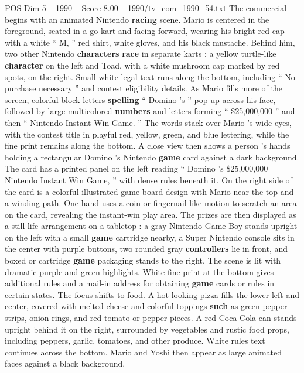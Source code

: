 \begin{textsample}{POS Dim 5 – 1990 – Score 8.00 – 1990/tv\_com\_1990\_54.txt}  \label{ex:f5_pos_017}
The commercial begins with an animated Nintendo \textbf{racing} scene.
Mario is centered in the foreground, seated in a go-kart and facing forward, wearing his bright red cap with a white “ M, ” red shirt, white gloves, and his black mustache.
Behind him, two other Nintendo \textbf{characters} \textbf{race} in separate karts : a yellow turtle-like \textbf{character} on the left and Toad, with a white mushroom cap marked by red spots, on the right.
Small white legal text runs along the bottom, including “ No purchase necessary ” and contest eligibility details.
As Mario fills more of the screen, colorful block letters \textbf{spelling} “ Domino ’s ” pop up across his face, followed by large multicolored \textbf{numbers} and letters forming “ \$25,000,000 ” and then “ Nintendo Instant Win Game. ” The words stack over Mario ’s wide eyes, with the contest title in playful red, yellow, green, and blue lettering, while the fine print remains along the bottom.
A close view then shows a person ’s hands holding a rectangular Domino ’s Nintendo \textbf{game} card against a dark background.
The card has a printed panel on the left reading “ Domino ’s \$25,000,000 Nintendo Instant Win Game, ” with dense rules beneath it.
On the right side of the card is a colorful illustrated game-board design with Mario near the top and a winding path.
One hand uses a coin or fingernail-like motion to scratch an area on the card, revealing the instant-win play area.
The prizes are then displayed as a still-life arrangement on a tabletop : a gray Nintendo Game Boy stands upright on the left with a small \textbf{game} cartridge nearby, a Super Nintendo console sits in the center with purple buttons, two rounded gray \textbf{controllers} lie in front, and boxed or cartridge \textbf{game} packaging stands to the right.
The scene is lit with dramatic purple and green highlights.
White fine print at the bottom gives additional rules and a mail-in address for obtaining \textbf{game} cards or rules in certain states.
The focus shifts to food.
A hot-looking pizza fills the lower left and center, covered with melted cheese and colorful toppings \textbf{such} as green pepper strips, onion rings, and red tomato or pepper pieces.
A red Coca-Cola can stands upright behind it on the right, surrounded by vegetables and rustic food props, including peppers, garlic, tomatoes, and other produce.
White rules text continues across the bottom.
Mario and Yoshi then appear as large animated faces against a black background.

\end{textsample}

